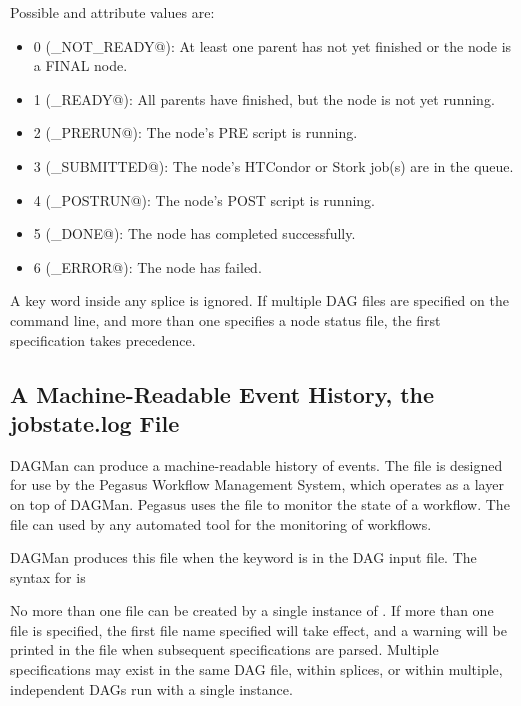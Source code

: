 Possible  and  attribute values are:

\begin{itemize}
\item 0 (\verb@STATUS_NOT_READY@): At least one parent has not yet finished
or the node is a FINAL node.
\item 1 (\verb@STATUS_READY@): All parents have finished, but the node is not
yet running.
\item 2 (\verb@STATUS_PRERUN@): The node's PRE script is running.
\item 3 (\verb@STATUS_SUBMITTED@): The node's HTCondor or Stork job(s) are in 
  the queue.
\item 4 (\verb@STATUS_POSTRUN@): The node's POST script is running.
\item 5 (\verb@STATUS_DONE@): The node has completed successfully.
\item 6 (\verb@STATUS_ERROR@): The node has failed.
\end{itemize}

A  key word inside any splice is ignored.
If multiple DAG files are specified on the  command line,
and more than one specifies a node status file,
the first specification takes precedence.

\subsection{\label{sec:DAGJobstateLog}A Machine-Readable Event History, the jobstate.log File}

DAGMan can produce a machine-readable history of events.
The  file is designed for use by the Pegasus Workflow
Management System, which operates as a layer on top of DAGMan.  Pegasus
uses the  file to monitor the state of a workflow.
The  file can used by any
automated tool for the monitoring of workflows.

DAGMan produces this file when the keyword  is
in the DAG input file.
The syntax for  is

 

No more than one  file can be created by a single
instance of .
If more than one  file is specified,
the first file name specified will take effect,
and a warning will be printed in the  file
when subsequent  specifications are parsed.
Multiple specifications may exist in the same DAG file, within splices,
or within multiple, independent DAGs run with a single  instance.

